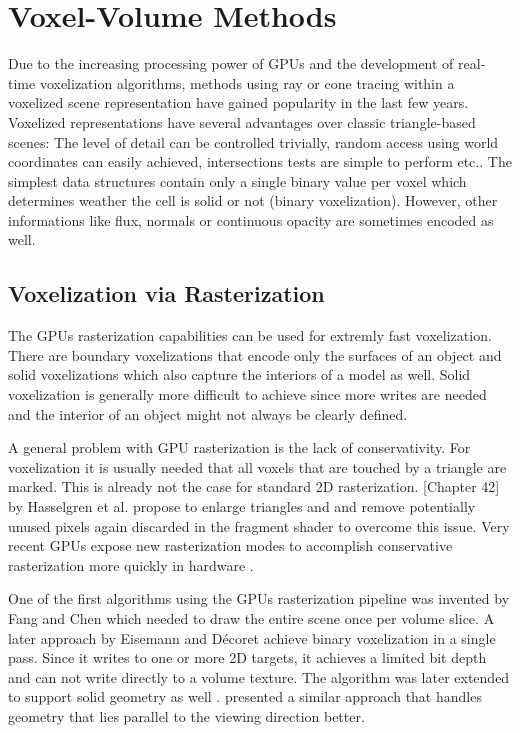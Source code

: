 \documentclass[thesis.tex]{subfiles}
\begin{document}
\section{Voxel-Volume Methods} \label{sec:prev:voxelmethods}
Due to the increasing processing power of GPUs and the development of real-time voxelization algorithms, methods using ray or cone tracing within a voxelized scene representation have gained popularity in the last few years.
Voxelized representations have several advantages over classic triangle-based scenes:
The level of detail can be controlled trivially, random access using world coordinates can easily achieved, intersections tests are simple to perform etc..
The simplest data structures contain only a single binary value per voxel which determines weather the cell is solid or not (binary voxelization).
However, other informations like flux, normals or continuous opacity are sometimes encoded as well.

\subsection{Voxelization via Rasterization}
The GPUs rasterization capabilities can be used for extremly fast voxelization.
There are boundary voxelizations that encode only the surfaces of an object and solid voxelizations which also capture the interiors of a model as well.
Solid voxelization is generally more difficult to achieve since more writes are needed and the interior of an object might not always be clearly defined.

A general problem with GPU rasterization is the lack of conservativity. 
For voxelization it is usually needed that all voxels that are touched by a triangle are marked.
This is already not the case for standard 2D rasterization.
\cite{bib:GPUGems2}[Chapter 42] by Hasselgren et al. propose to enlarge triangles and and remove potentially unused pixels again discarded in the fragment shader to overcome this issue.
Very recent GPUs expose new rasterization modes to accomplish conservative rasterization more quickly in hardware \cite{bib:nvconservativeraster}.


One of the first algorithms using the GPUs rasterization pipeline was invented by Fang and Chen \cite{bib:fangvoxelization} which needed to draw the entire scene once per volume slice.
A later approach by Eisemann and D{\'e}coret \cite{bib:eisemann:boundaryvox} achieve binary voxelization in a single pass.
Since it writes to one or more 2D targets, it achieves a limited bit depth and can not write directly to a volume texture.
The algorithm was later extended to support solid geometry as well \cite{bib:eisemann:solidvox}. 
\cite{bib:dong:voxelization} presented a similar approach that handles geometry that lies parallel to the viewing direction better. 
\end{document}
